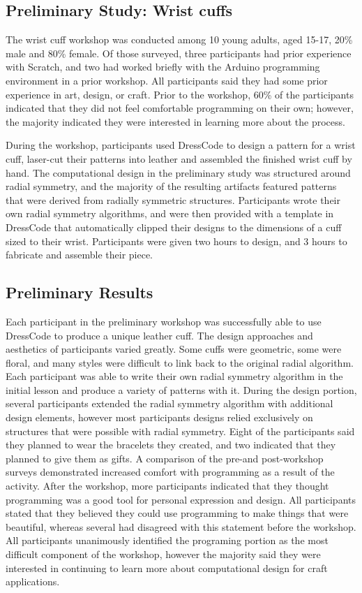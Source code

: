 \documentclass{sigchi}
\begin{document}
\subsection{Preliminary Study: Wrist cuffs}
The wrist cuff workshop was conducted among 10 young adults, aged 15-17, 20\% male and 80\% female. Of those surveyed, three participants had prior experience with Scratch, and two had worked briefly with the Arduino programming environment in a prior workshop. All participants said they had some prior experience in art, design, or craft. Prior to the workshop, 60\% of the participants indicated that they did not feel comfortable programming on their own; however, the majority indicated they were interested in learning more about the process. 

During the workshop, participants used DressCode to design a pattern for a wrist cuff, laser-cut their patterns into leather and assembled the finished wrist cuff by hand. The computational design in the preliminary study was structured around radial symmetry, and the majority of the resulting artifacts featured patterns that were derived from radially symmetric structures. Participants wrote their own radial symmetry algorithms, and were then provided with a template in DressCode that automatically clipped their designs to the dimensions of a cuff sized to their wrist. Participants were given two hours to design, and 3 hours to fabricate and assemble their piece.

\subsection{Preliminary Results}
Each participant in the preliminary workshop was successfully able to use DressCode to produce a unique leather cuff. The design approaches and aesthetics of participants varied greatly. Some cuffs were geometric, some were floral, and many styles were difficult to link back to the original radial algorithm. Each participant was able to write their own radial symmetry algorithm in the initial lesson and produce a variety of patterns with it. During the design portion, several participants extended the radial symmetry algorithm with additional design elements, however most participants designs relied exclusively on structures that were possible with radial symmetry. Eight of the participants said they planned to wear the bracelets they created, and two indicated that they planned to give them as gifts. A comparison of the
pre-and post-workshop surveys demonstrated increased comfort with programming as a result of the activity. After the workshop, more participants indicated that they thought programming was a good tool for personal expression and design. All participants stated that they believed they could use programming to make things that were beautiful, whereas several had disagreed with this statement before the workshop. All participants unanimously identified the programing portion as the most difficult component of the workshop, however the majority said they were interested in continuing to learn more about computational design for craft applications. 
\end{document}
